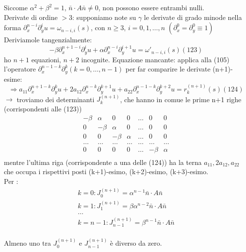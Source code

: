\documentclass[a4paper,11pt]{report}
\begin{document}
Siccome $\alpha^2 + \beta^2 =1$, $\bar{n}\cdot A \bar{n}\neq 0$, non possono essere entrambi nulli.\\
Derivate di ordine $>3$: supponiamo note su $\gamma$ le derivate di grado minode nella forma $\partial_x^{n-i}\partial_y^i u = \omega_{n-i,i} (s)$, con $n\geq 3$, $i=0,1,\dots, n$ $(\partial_x^0 = \partial_y^0 \equiv 1)$\\
Deriviamole tangenzialmente:
\begin{equation}
-\beta \partial_x^{n+1-i}\partial_y^{i}u +\alpha \partial_x^{n-i}\partial_y^{i+1}u = \omega'_{n-i,i}(s) (123)
\end{equation}
ho $n+1$ equazioni, $n+2$ incognite. Equazione mancante: applica alla (105) l'operatore $\partial_x^{n-1-k}\partial_y^k (k=0,\dots,n-1)$ per far comparire le derivate (n+1)-esime:\\
\begin{equation}
\Rightarrow a_{11}\partial_x^{n+1-k}\partial_y^k u + 2a_{12}\partial_x^{n-k}\partial_y^{k+1}u + a_22 \partial_x^{n-1-k}\partial_y^{k+2}u = r_k^{(n+1)}(s) (124)
\end{equation}
$\rightarrow$ troviamo dei determinanti $J_k^{(n+1)}$, che hanno in comue le prime n+1 righe (corrispondenti alle (123))
$$
\begin{matrix}
-\beta & \alpha & 0 & 0 & \dots & 0 & 0\\
0 & -\beta & \alpha & 0 & \dots & 0 & 0\\
0 & 0 &-\beta & \alpha  & \dots & 0 & 0\\
\dots & \dots & \dots & \dots & \dots & \dots & \dots \\
0 & 0 & 0 & 0 &  \dots & -\beta & \alpha\\
\end{matrix}
$$
mentre l'ultima riga (corrispondente a una delle (124)) ha la terna $ a_{11},2a_{12},a_{22}$ che occupa i rispettivi posti (k+1)-esimo, (k+2)-esimo, (k+3)-esimo.\\
Per :
$$
\begin{matrix}
k=0 : J_0^{(n+1)} = \alpha^{n-1}\bar{n}\cdot A\bar{n}\\
k=1 : J_1^{(n+1)} = \beta\alpha^{n-2}\bar{n}\cdot A\bar{n}\\
\dots \\
k=n-1 : J_{n-1}^{(n+1)} = \beta^{n-1}\bar{n}\cdot A\bar{n}\\
\end{matrix}
$$

Almeno uno tra $J_0^{(n+1)}$ e $J_{n-1}^{(n+1)}$ è diverso da zero.
\end{document}
